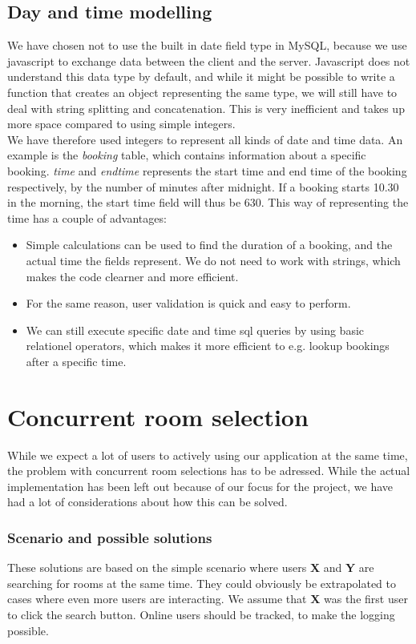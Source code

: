 \subsection{Day and time modelling}
\label{sub:day_and_time_modelling}
We have chosen not to use the built in date field type in MySQL, because we use javascript to exchange data between the client and the server. Javascript does not understand this data type by default, and while it might be possible to write a function that creates an object representing the same type, we will still have to deal with string splitting and concatenation. This is very inefficient and takes up more space compared to using simple integers.\\
We have therefore used integers to represent all kinds of date and time data. An example is the \emph{booking} table, which contains information about a specific booking. \emph{time} and \emph{endtime} represents the start time and end time of the booking respectively, by the number of minutes after midnight. If a booking starts 10.30 in the morning, the start time field will thus be 630. This way of representing the time has a couple of advantages:

\begin{itemize}
	\item Simple calculations can be used to find the duration of a booking, and the actual time the fields represent. We do not need to work with strings, which makes the code clearner and more efficient.
	\item For the same reason, user validation is quick and easy to perform.
	\item We can still execute specific date and time sql queries by using basic relationel operators, which makes it more efficient to e.g. lookup bookings after a specific time.
\end{itemize}

\section{Concurrent room selection}
\label{sub:challenges_concurrent_rooms}
While we expect a lot of users to actively using our application at the same time, the problem with concurrent room selections has to be adressed. While the actual implementation has been left out because of our focus for the project, we have had a lot of considerations about how this can be solved.\\

\subsubsection*{Scenario and possible solutions}
These solutions are based on the simple scenario where users \textbf{X} and \textbf{Y} are searching for rooms at the same time. They could obviously be extrapolated to cases where even more users are interacting. We assume that \textbf{X} was the first user to click the search button. Online users should be tracked, to make the logging possible.
